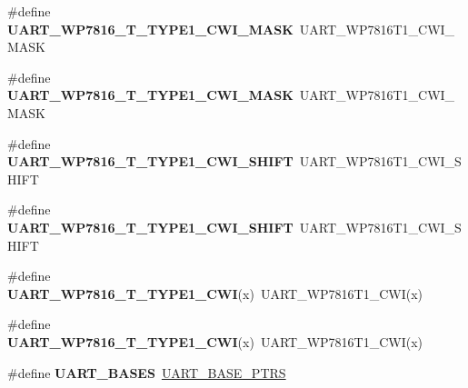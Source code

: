 \begin{DoxyCompactItemize}
\item 
\#define {\bfseries U\+A\+R\+T\+\_\+\+W\+P7816\+\_\+\+T\+\_\+\+T\+Y\+P\+E1\+\_\+\+C\+W\+I\+\_\+\+M\+A\+SK}~U\+A\+R\+T\+\_\+\+W\+P7816\+T1\+\_\+\+C\+W\+I\+\_\+\+M\+A\+SK\hypertarget{group__Backward__Compatibility__Symbols_gac187226c5d0a1c13888f04cb6fd837b1}{}\label{group__Backward__Compatibility__Symbols_gac187226c5d0a1c13888f04cb6fd837b1}

\item 
\#define {\bfseries U\+A\+R\+T\+\_\+\+W\+P7816\+\_\+\+T\+\_\+\+T\+Y\+P\+E1\+\_\+\+C\+W\+I\+\_\+\+M\+A\+SK}~U\+A\+R\+T\+\_\+\+W\+P7816\+T1\+\_\+\+C\+W\+I\+\_\+\+M\+A\+SK\hypertarget{group__Backward__Compatibility__Symbols_gac187226c5d0a1c13888f04cb6fd837b1}{}\label{group__Backward__Compatibility__Symbols_gac187226c5d0a1c13888f04cb6fd837b1}

\item 
\#define {\bfseries U\+A\+R\+T\+\_\+\+W\+P7816\+\_\+\+T\+\_\+\+T\+Y\+P\+E1\+\_\+\+C\+W\+I\+\_\+\+S\+H\+I\+FT}~U\+A\+R\+T\+\_\+\+W\+P7816\+T1\+\_\+\+C\+W\+I\+\_\+\+S\+H\+I\+FT\hypertarget{group__Backward__Compatibility__Symbols_gad9cb85843e4cabc17e896f27901df941}{}\label{group__Backward__Compatibility__Symbols_gad9cb85843e4cabc17e896f27901df941}

\item 
\#define {\bfseries U\+A\+R\+T\+\_\+\+W\+P7816\+\_\+\+T\+\_\+\+T\+Y\+P\+E1\+\_\+\+C\+W\+I\+\_\+\+S\+H\+I\+FT}~U\+A\+R\+T\+\_\+\+W\+P7816\+T1\+\_\+\+C\+W\+I\+\_\+\+S\+H\+I\+FT\hypertarget{group__Backward__Compatibility__Symbols_gad9cb85843e4cabc17e896f27901df941}{}\label{group__Backward__Compatibility__Symbols_gad9cb85843e4cabc17e896f27901df941}

\item 
\#define {\bfseries U\+A\+R\+T\+\_\+\+W\+P7816\+\_\+\+T\+\_\+\+T\+Y\+P\+E1\+\_\+\+C\+WI}(x)~U\+A\+R\+T\+\_\+\+W\+P7816\+T1\+\_\+\+C\+WI(x)\hypertarget{group__Backward__Compatibility__Symbols_ga5326ca16b01f2260770c19cedaef87eb}{}\label{group__Backward__Compatibility__Symbols_ga5326ca16b01f2260770c19cedaef87eb}

\item 
\#define {\bfseries U\+A\+R\+T\+\_\+\+W\+P7816\+\_\+\+T\+\_\+\+T\+Y\+P\+E1\+\_\+\+C\+WI}(x)~U\+A\+R\+T\+\_\+\+W\+P7816\+T1\+\_\+\+C\+WI(x)\hypertarget{group__Backward__Compatibility__Symbols_ga5326ca16b01f2260770c19cedaef87eb}{}\label{group__Backward__Compatibility__Symbols_ga5326ca16b01f2260770c19cedaef87eb}

\item 
\#define {\bfseries U\+A\+R\+T\+\_\+\+B\+A\+S\+ES}~\hyperlink{group__UART__Peripheral__Access__Layer_ga7b34a38b9492a1e1007b2f66383aef17}{U\+A\+R\+T\+\_\+\+B\+A\+S\+E\+\_\+\+P\+T\+RS}\hypertarget{group__Backward__Compatibility__Symbols_ga96431c7046bbe06c387d7c8452f7f86d}{}\label{group__Backward__Compatibility__Symbols_ga96431c7046bbe06c387d7c8452f7f86d}


\end{DoxyCompactItemize}
